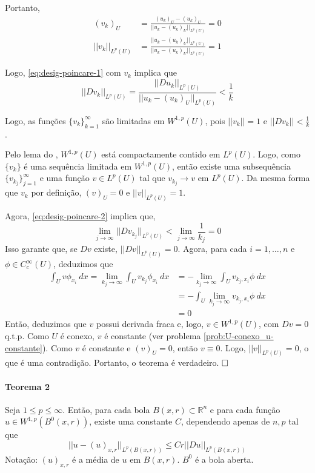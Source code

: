 \documentclass[a4paper, 11pt]{article}
\newcommand{\qed}{$\hfill\square$}
\begin{document}
Portanto, \begin{align*}
	(v_k)_U &= \frac{(u_k)_U - (u_k)_U}{||u_k - (u_k)_U||_{L^p(U)}} = 0 \\
	||v_k||_{L^p(U)} &= \frac{||u_k - (u_k)_U||_{L^p(U)}}{||u_k - (u_k)_U||_{L^p(U)}} = 1
\end{align*}

Logo, \eqref{eq:desig-poincare-1} com $v_k$ implica que \begin{equation}\label{eq:desig-poincare-2}
	|| Dv_k||_{L^p(U)} = \frac{||Du_k||_{L^p(U)}}{||u_k - (u_k)_U||_{L^p(U)}} < \frac{1}{k}
\end{equation}

Logo, as funções $\{v_k\}_{k=1}^\infty$ são limitadas em $W^{1,p}(U)$, pois $||v_k||=1$ e $||Dv_k||<\frac{1}{k}$. 

Pelo lema do , $W^{1,p}(U)$ está compactamente contido em $L^p(U)$. Logo, como $\{v_k\}$ é uma sequência limitada em $W^{1,p}(U)$, então existe uma subsequência $\{v_{k_j}\}_{j=1}^\infty$ e uma função $v \in L^p(U)$ tal que $v_{k_j}\rightarrow v \text{ em } L^p(U)$. Da mesma forma que $v_k$ por definição, $(v)_U=0$ e $||v||_{L^p(U)}=1$.

Agora, \eqref{eq:desig-poincare-2} implica que, \begin{equation*}
	\lim_{j\rightarrow\infty} ||Dv_{k_j}||_{L^p(U)} < \lim_{j\rightarrow\infty} \frac{1}{k_j} = 0
\end{equation*} Isso garante que, se $Dv$ existe, $||Dv||_{L^p(U)}=0$. Agora, para cada $i=1,\ldots,n$ e $\phi \in C^\infty_c(U)$, deduzimos que \begin{align*}
\int_U v \phi_{x_i}\ dx = \lim_{k_j \rightarrow \infty} \int_U v_{k_j} \phi_{x_i}\ dx &= - \lim_{k_j \rightarrow \infty } \int_U v_{k_j,x_i} \phi \ dx \\ 
&=  -  \int_U \lim_{k_j \rightarrow \infty } v_{k_j,x_i} \phi \ dx \\
&= 0 \end{align*} 
Então, deduzimos que $v$ possui derivada fraca e, logo, $v \in W^{1,p}(U)$, com $Dv=0$ q.t.p. Como $U$ é conexo, $v$ é constante (ver problema \ref{prob:U-conexo_u-constante}). Como $v$ é constante e $(v)_U=0$, então $v \equiv 0$. Logo, $||v||_{L^p(U)}=0$, o que é uma contradição. Portanto, o teorema é verdadeiro. \qed



\paragraph{Teorema 2}\label{t:sobolev-poincare-2}
Seja \(1\leq p \leq \infty\). Então, para cada bola \(B(x,r)\subset \mathbb{R}^n\) e para cada função \(u \in W^{1,p}(B^0(x,r))\), existe uma constante \(C\), dependendo apenas de \(n,p\) tal que \[||u - (u)_{x,r}||_{L^p(B(x,r))} \leq Cr ||Du||_{L^p(B(x,r))}\]
Notação: \((u)_{x,r}\) é a média de \(u\) em \(B(x,r)\). \(B^0\) é a bola aberta.
\end{document}
